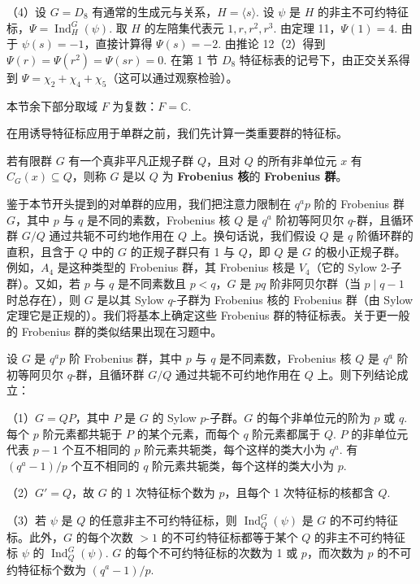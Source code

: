 （4）设 \(G = D_8\) 有通常的生成元与关系，\(H = \langle s\rangle\). 设 \(\psi\) 是 \(H\) 的非主不可约特征标，\(\Psi = \operatorname{Ind}_H^G(\psi)\). 取 \(H\) 的左陪集代表元 \(1, r, r^2, r^3\). 由定理 11，\(\Psi(1) = 4\). 由于 \(\psi(s) = -1\)，直接计算得 \(\Psi(s) = -2\). 由推论 12（2）得到 \(\Psi(r) = \Psi(r^2) = \Psi(sr) = 0\). 在第 1 节 \(D_8\) 特征标表的记号下，由正交关系得到 \(\Psi = \chi_2+\chi_4+\chi_5\)（这可以通过观察检验）。

本节余下部分取域 \(F\) 为复数：\(F = \mathbb{C}\).

在用诱导特征标应用于单群之前，我们先计算一类重要群的特征标。

\begin{definition}
若有限群 \(G\) 有一个真非平凡正规子群 \(Q\)，且对 \(Q\) 的所有非单位元 \(x\) 有 \(C_G(x) \subseteq Q\)，则称 \(G\) 是以 \(Q\) 为 \textbf{Frobenius 核}的 \textbf{Frobenius 群}。
\end{definition}

鉴于本节开头提到的对单群的应用，我们把注意力限制在 \(q^ap\) 阶的 Frobenius 群 \(G\)，其中 \(p\) 与 \(q\) 是不同的素数，Frobenius 核 \(Q\) 是 \(q^a\) 阶初等阿贝尔 \(q\)-群，且循环群 \(G/Q\) 通过共轭不可约地作用在 \(Q\) 上。换句话说，我们假设 \(Q\) 是 \(q\) 阶循环群的直积，且含于 \(Q\) 中的 \(G\) 的正规子群只有 1 与 \(Q\)，即 \(Q\) 是 \(G\) 的极小正规子群。例如，\(A_4\) 是这种类型的 Frobenius 群，其 Frobenius 核是 \(V_4\)（它的 Sylow 2-子群）。又如，若 \(p\) 与 \(q\) 是不同素数且 \(p < q\)，\(G\) 是 \(pq\) 阶非阿贝尔群（当 \(p \mid q-1\) 时总存在），则 \(G\) 是以其 Sylow \(q\)-子群为 Frobenius 核的 Frobenius 群（由 Sylow 定理它是正规的）。我们将基本上确定这些 Frobenius 群的特征标表。关于更一般的 Frobenius 群的类似结果出现在习题中。

\begin{proposition}\label{pro:19.13}
设 \(G\) 是 \(q^ap\) 阶 Frobenius 群，其中 \(p\) 与 \(q\) 是不同素数，Frobenius 核 \(Q\) 是 \(q^a\) 阶初等阿贝尔 \(q\)-群，且循环群 \(G/Q\) 通过共轭不可约地作用在 \(Q\) 上。则下列结论成立：

（1）\(G = QP\)，其中 \(P\) 是 \(G\) 的 Sylow \(p\)-子群。\(G\) 的每个非单位元的阶为 \(p\) 或 \(q\). 每个 \(p\) 阶元素都共轭于 \(P\) 的某个元素，而每个 \(q\) 阶元素都属于 \(Q\). \(P\) 的非单位元代表 \(p-1\) 个互不相同的 \(p\) 阶元素共轭类，每个这样的类大小为 \(q^a\). 有 \((q^a-1)/p\) 个互不相同的 \(q\) 阶元素共轭类，每个这样的类大小为 \(p\).

（2）\(G' = Q\)，故 \(G\) 的 1 次特征标个数为 \(p\)，且每个 1 次特征标的核都含 \(Q\).

（3）若 \(\psi\) 是 \(Q\) 的任意非主不可约特征标，则 \(\operatorname{Ind}_Q^G(\psi)\) 是 \(G\) 的不可约特征标。此外，\(G\) 的每个次数 \(> 1\) 的不可约特征标都等于某个 \(Q\) 的非主不可约特征标 \(\psi\) 的 \(\operatorname{Ind}_Q^G(\psi)\). \(G\) 的每个不可约特征标的次数为 1 或 \(p\)，而次数为 \(p\) 的不可约特征标个数为 \((q^a-1)/p\).
\end{proposition}

